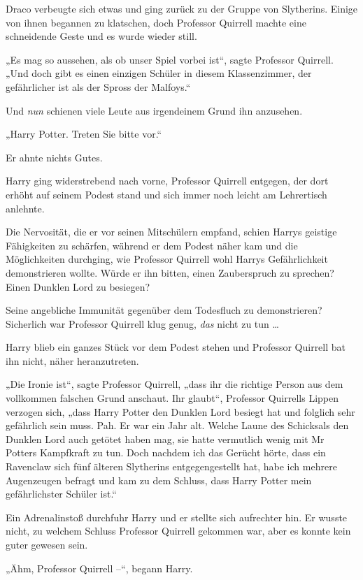 {Draco verbeugte sich etwas und ging zurück zu der Gruppe von Slytherins. Einige von ihnen begannen zu klatschen, doch Professor Quirrell machte eine schneidende Geste und es wurde wieder still.

„Es mag so aussehen, als ob unser Spiel vorbei ist“, sagte Professor Quirrell. „Und doch gibt es einen einzigen Schüler in diesem Klassenzimmer, der gefährlicher ist als der Spross der Malfoys.“

Und \emph{nun} schienen viele Leute aus irgendeinem Grund ihn anzusehen.

„Harry Potter. Treten Sie bitte vor.“

Er ahnte nichts Gutes.

Harry ging widerstrebend nach vorne, Professor Quirrell entgegen, der dort erhöht auf seinem Podest stand und sich immer noch leicht am Lehrertisch anlehnte.

Die Nervosität, die er vor seinen Mitschülern empfand, schien Harrys geistige Fähigkeiten zu schärfen, während er dem Podest näher kam und die Möglichkeiten durchging, wie Professor Quirrell wohl Harrys Gefährlichkeit demonstrieren wollte. Würde er ihn bitten, einen Zauberspruch zu sprechen? Einen Dunklen Lord zu besiegen?

Seine angebliche Immunität gegenüber dem Todesfluch zu demonstrieren? Sicherlich war Professor Quirrell klug genug, \emph{das} nicht zu tun …

Harry blieb ein ganzes Stück vor dem Podest stehen und Professor Quirrell bat ihn nicht, näher heranzutreten.

„Die Ironie ist“, sagte Professor Quirrell, „dass ihr die richtige Person aus dem vollkommen falschen Grund anschaut. Ihr glaubt“, Professor Quirrells Lippen verzogen sich, „dass Harry Potter den Dunklen Lord besiegt hat und folglich sehr gefährlich sein muss. Pah. Er war ein Jahr alt. Welche Laune des Schicksals den Dunklen Lord auch getötet haben mag, sie hatte vermutlich wenig mit Mr Potters Kampfkraft zu tun. Doch nachdem ich das Gerücht hörte, dass ein Ravenclaw sich fünf älteren Slytherins entgegengestellt hat, habe ich mehrere Augenzeugen befragt und kam zu dem Schluss, dass Harry Potter mein gefährlichster Schüler ist.“

Ein Adrenalinstoß durchfuhr Harry und er stellte sich aufrechter hin. Er wusste nicht, zu welchem Schluss Professor Quirrell gekommen war, aber es konnte kein guter gewesen sein.

„Ähm, Professor Quirrell --“, begann Harry.

}
